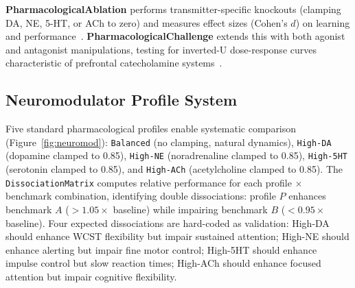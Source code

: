 \documentclass[11pt,letterpaper]{article}
\begin{document}
\textbf{PharmacologicalAblation} performs transmitter-specific knockouts (clamping DA, NE, 5-HT, or ACh to zero) and measures effect sizes (Cohen's $d$) on learning and performance~\citep{schultz1997dopamine}. \textbf{PharmacologicalChallenge} extends this with both agonist and antagonist manipulations, testing for inverted-U dose-response curves characteristic of prefrontal catecholamine systems~\citep{arnsten2011catecholamine}.

\subsection{Neuromodulator Profile System}

Five standard pharmacological profiles enable systematic comparison (Figure~\ref{fig:neuromod}): \texttt{Balanced} (no clamping, natural dynamics), \texttt{High-DA} (dopamine clamped to 0.85), \texttt{High-NE} (noradrenaline clamped to 0.85), \texttt{High-5HT} (serotonin clamped to 0.85), and \texttt{High-ACh} (acetylcholine clamped to 0.85). The \texttt{DissociationMatrix} computes relative performance for each profile $\times$ benchmark combination, identifying double dissociations: profile $P$ enhances benchmark $A$ ($> 1.05\times$ baseline) while impairing benchmark $B$ ($< 0.95\times$ baseline). Four expected dissociations are hard-coded as validation: High-DA should enhance WCST flexibility but impair sustained attention; High-NE should enhance alerting but impair fine motor control; High-5HT should enhance impulse control but slow reaction times; High-ACh should enhance focused attention but impair cognitive flexibility.
\end{document}
